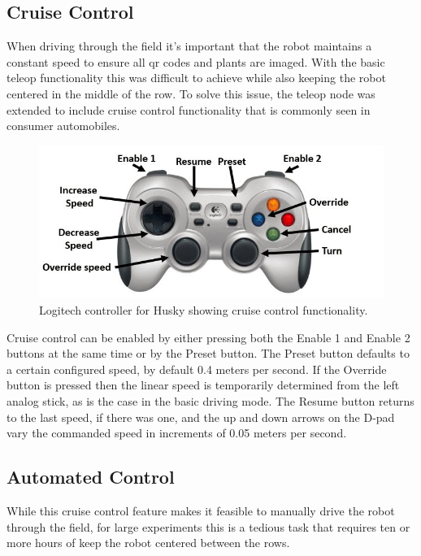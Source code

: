 \subsection{Cruise Control}

When driving through the field it's important that the robot maintains a constant speed to ensure all \ac{qr} codes and plants are imaged.  With the basic teleop functionality this was difficult to achieve while also keeping the robot centered in the middle of the row. To solve this issue, the teleop node was extended to include cruise control functionality that is commonly seen in consumer automobiles.  

\begin{figure}
	\centering
    \includegraphics[width=5in]{figures/logitech_controller_labelled.jpg}
    \caption[Cruise control buttons]{Logitech controller for Husky showing cruise control functionality.}
    \label{figure:cruise_control}
\end{figure}

Cruise control can be enabled by either pressing both the Enable 1 and Enable 2 buttons at the same time or by the Preset button.  The Preset button defaults to a certain configured speed, by default 0.4 meters per second.  If the Override button is pressed then the linear speed is temporarily determined from the left analog stick, as is the case in the basic driving mode.  The Resume button returns to the last speed, if there was one, and the up and down arrows on the D-pad vary the commanded speed in increments of 0.05 meters per second.    

\subsection{Automated Control}
\label{section:automated_control}

While this cruise control feature makes it feasible to manually drive the robot through the field, for large experiments this is a tedious task that requires ten or more hours of keep the robot centered between the rows.

